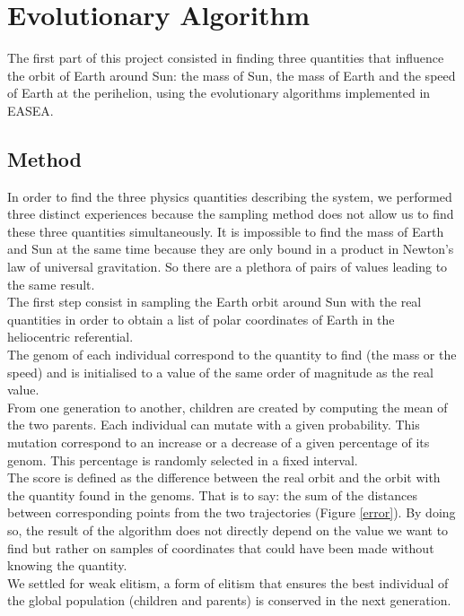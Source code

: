 \section{Evolutionary Algorithm}
The first part of this project consisted in finding three quantities that
influence the orbit of Earth around Sun: the mass of Sun, the mass of Earth and
the speed of Earth at the perihelion, using the evolutionary algorithms
implemented in EASEA.\\

\subsection{Method}
In order to find the three physics quantities describing the system, we
performed three distinct experiences because the
sampling method does not allow us to find these three quantities
simultaneously. It is impossible to find the mass of Earth and Sun at the same
time because they are only bound in a product in Newton's law of universal
gravitation. So there are a plethora of pairs of values leading to the same
result.\\

The first step consist in sampling the Earth orbit around Sun with the real
quantities in order to obtain a list of polar coordinates of Earth in the
heliocentric referential.\\
The genom of each individual correspond to the quantity to find (the mass or
the speed) and is initialised to a value of the same order of magnitude as the
real value.\\
From one generation to another, children are created by computing the mean of
the two parents. Each individual can mutate with a given probability. This
mutation correspond to an increase or a decrease of a given percentage of its
genom. This percentage is randomly selected in a fixed interval.\\
The score is defined as the difference between the real orbit and the orbit
with the quantity found in the genoms. That is to say: the sum of the distances
between corresponding points from the two trajectories (Figure \ref{error}). By
doing so, the
result of the algorithm does not directly depend on the value we want to find
but rather on samples of coordinates that could have been made without knowing
the quantity.\\
We settled for weak elitism, a form of elitism that ensures the best individual
of the global population (children and parents) is conserved in the next
generation.

